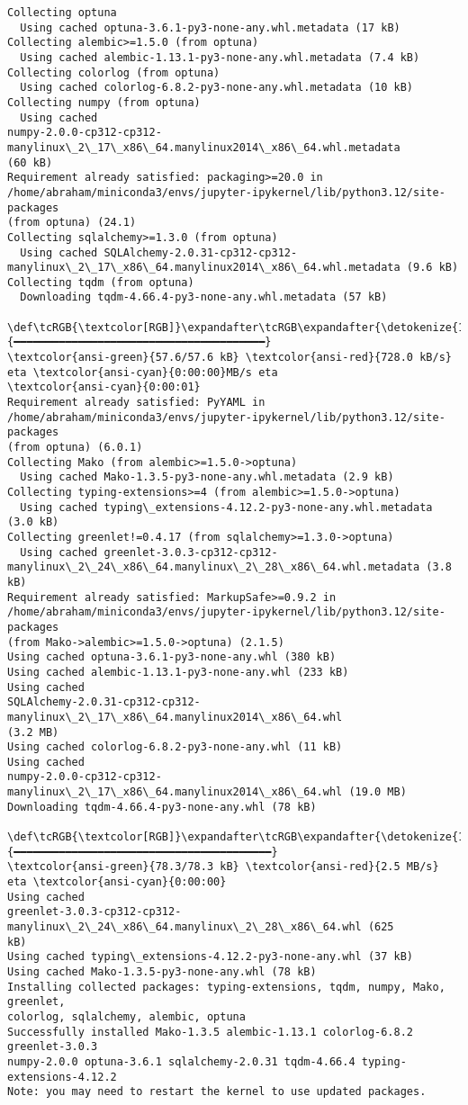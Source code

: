 \documentclass[11pt]{article}
\begin{document}
    \begin{Verbatim}[commandchars=\\\{\}]
Collecting optuna
  Using cached optuna-3.6.1-py3-none-any.whl.metadata (17 kB)
Collecting alembic>=1.5.0 (from optuna)
  Using cached alembic-1.13.1-py3-none-any.whl.metadata (7.4 kB)
Collecting colorlog (from optuna)
  Using cached colorlog-6.8.2-py3-none-any.whl.metadata (10 kB)
Collecting numpy (from optuna)
  Using cached
numpy-2.0.0-cp312-cp312-manylinux\_2\_17\_x86\_64.manylinux2014\_x86\_64.whl.metadata
(60 kB)
Requirement already satisfied: packaging>=20.0 in
/home/abraham/miniconda3/envs/jupyter-ipykernel/lib/python3.12/site-packages
(from optuna) (24.1)
Collecting sqlalchemy>=1.3.0 (from optuna)
  Using cached SQLAlchemy-2.0.31-cp312-cp312-
manylinux\_2\_17\_x86\_64.manylinux2014\_x86\_64.whl.metadata (9.6 kB)
Collecting tqdm (from optuna)
  Downloading tqdm-4.66.4-py3-none-any.whl.metadata (57 kB)
     \def\tcRGB{\textcolor[RGB]}\expandafter\tcRGB\expandafter{\detokenize{114,156,31}}{━━━━━━━━━━━━━━━━━━━━━━━━━━━━━━━━━━━━━━━}
\textcolor{ansi-green}{57.6/57.6 kB} \textcolor{ansi-red}{728.0 kB/s} eta \textcolor{ansi-cyan}{0:00:00}MB/s eta
\textcolor{ansi-cyan}{0:00:01}
Requirement already satisfied: PyYAML in
/home/abraham/miniconda3/envs/jupyter-ipykernel/lib/python3.12/site-packages
(from optuna) (6.0.1)
Collecting Mako (from alembic>=1.5.0->optuna)
  Using cached Mako-1.3.5-py3-none-any.whl.metadata (2.9 kB)
Collecting typing-extensions>=4 (from alembic>=1.5.0->optuna)
  Using cached typing\_extensions-4.12.2-py3-none-any.whl.metadata (3.0 kB)
Collecting greenlet!=0.4.17 (from sqlalchemy>=1.3.0->optuna)
  Using cached greenlet-3.0.3-cp312-cp312-
manylinux\_2\_24\_x86\_64.manylinux\_2\_28\_x86\_64.whl.metadata (3.8 kB)
Requirement already satisfied: MarkupSafe>=0.9.2 in
/home/abraham/miniconda3/envs/jupyter-ipykernel/lib/python3.12/site-packages
(from Mako->alembic>=1.5.0->optuna) (2.1.5)
Using cached optuna-3.6.1-py3-none-any.whl (380 kB)
Using cached alembic-1.13.1-py3-none-any.whl (233 kB)
Using cached
SQLAlchemy-2.0.31-cp312-cp312-manylinux\_2\_17\_x86\_64.manylinux2014\_x86\_64.whl
(3.2 MB)
Using cached colorlog-6.8.2-py3-none-any.whl (11 kB)
Using cached
numpy-2.0.0-cp312-cp312-manylinux\_2\_17\_x86\_64.manylinux2014\_x86\_64.whl (19.0 MB)
Downloading tqdm-4.66.4-py3-none-any.whl (78 kB)
   \def\tcRGB{\textcolor[RGB]}\expandafter\tcRGB\expandafter{\detokenize{114,156,31}}{━━━━━━━━━━━━━━━━━━━━━━━━━━━━━━━━━━━━━━━━}
\textcolor{ansi-green}{78.3/78.3 kB} \textcolor{ansi-red}{2.5 MB/s} eta \textcolor{ansi-cyan}{0:00:00}
Using cached
greenlet-3.0.3-cp312-cp312-manylinux\_2\_24\_x86\_64.manylinux\_2\_28\_x86\_64.whl (625
kB)
Using cached typing\_extensions-4.12.2-py3-none-any.whl (37 kB)
Using cached Mako-1.3.5-py3-none-any.whl (78 kB)
Installing collected packages: typing-extensions, tqdm, numpy, Mako, greenlet,
colorlog, sqlalchemy, alembic, optuna
Successfully installed Mako-1.3.5 alembic-1.13.1 colorlog-6.8.2 greenlet-3.0.3
numpy-2.0.0 optuna-3.6.1 sqlalchemy-2.0.31 tqdm-4.66.4 typing-extensions-4.12.2
Note: you may need to restart the kernel to use updated packages.
    \end{Verbatim}
\end{document}
